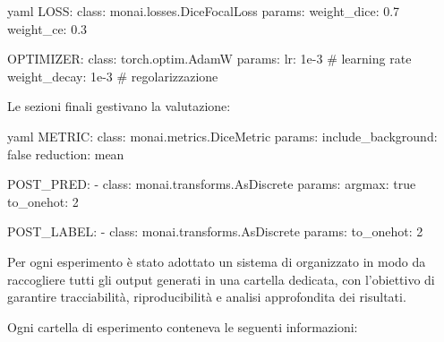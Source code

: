 \begin{code}{yaml}
LOSS:
  class: monai.losses.DiceFocalLoss
  params:
    weight_dice: 0.7
    weight_ce: 0.3

OPTIMIZER:
  class: torch.optim.AdamW
  params:
    lr: 1e-3               # learning rate
    weight_decay: 1e-3      # regolarizzazione
\end{code}


Le sezioni finali gestivano la valutazione:

\begin{code}{yaml}
METRIC:
  class: monai.metrics.DiceMetric
  params:
    include_background: false
    reduction: mean

POST_PRED:                                                                              
  - class: monai.transforms.AsDiscrete
    params:
      argmax: true
      to_onehot: 2

POST_LABEL:                                                                                 
  - class: monai.transforms.AsDiscrete
    params:
      to_onehot: 2
\end{code}




Per ogni esperimento è stato adottato un sistema di  organizzato in modo da raccogliere tutti gli output generati in una cartella dedicata, con l’obiettivo di garantire tracciabilità, riproducibilità e analisi approfondita dei risultati.

Ogni cartella di esperimento conteneva le seguenti informazioni:

